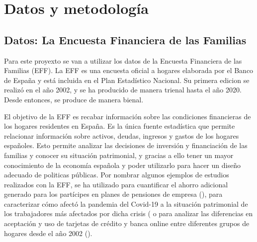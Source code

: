 \chapter{Datos y metodología}
\label{chapter:datos_metodologia}
\section{Datos: La Encuesta Financiera de las Familias}

Para este proyexto se van a utilizar los datos de la Encuesta Financiera de las Familias (EFF). La EFF es una encuesta oficial a hogares elaborada por el Banco de España y está incluida en el Plan Estadístico Nacional. Su primera edicion se realizó en el año 2002, y se ha producido de manera trienal hasta el año 2020. Desde entonces, se produce de manera bienal.

El objetivo de la EFF es recabar información sobre las condiciones financieras de los hogares residentes en España. Es la única fuente estadística que permite relacionar información sobre activos, deudas, ingresos y gastos de los hogares españoles. Esto permite analizar las decisiones de inversión y financiación de las familias y conocer su situación patrimonial, y gracias a ello tener un mayor conocimiento de la economía española y poder utilizarlo para hacer un diseño adecuado de politicas públicas. Por nombrar algunos ejemplos de estudios realizados con la EFF, se ha utilizado para cuantificar el ahorro adicional generado para los partícipes en planes de pensiones de empresa (\cite{gomez2022pensiones}), para caracterizar cómo afectó la pandemia del Covid-19 a la situación patrimonial de los trabajadores más afectados por dicha crisis (\cite{alvargonzalez2020pandemia} o para analizar las diferencias en aceptación y uso de tarjetas de crédito y banca online entre diferentes grupos de hogares desde el año 2002 (\cite{crespo2023bancaonline}).

